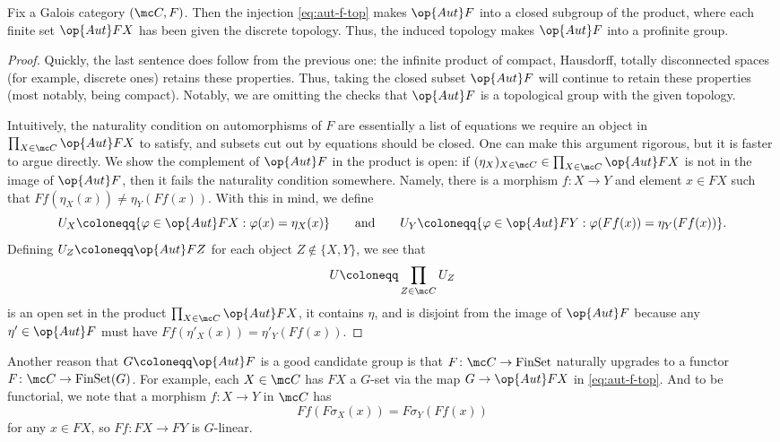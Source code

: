 \documentclass{amsart}
\begin{document}
\begin{lemma}
    Fix a Galois category $(\mc C,F)$. Then the injection \eqref{eq:aut-f-top} makes $\op{Aut}F$ into a closed subgroup of the product, where each finite set $\op{Aut}FX$ has been given the discrete topology. Thus, the induced topology makes $\op{Aut}F$ into a profinite group.
\end{lemma}
\begin{proof}
    Quickly, the last sentence does follow from the previous one: the infinite product of compact, Hausdorff, totally disconnected spaces (for example, discrete ones) retains these properties. Thus, taking the closed subset $\op{Aut}F$ will continue to retain these properties (most notably, being compact). Notably, we are omitting the checks that $\op{Aut}F$ is a topological group with the given topology.

    Intuitively, the naturality condition on automorphisms of $F$ are essentially a list of equations we require an object in $\prod_{X\in\mc C}\op{Aut}FX$ to satisfy, and subsets cut out by equations should be closed. One can make this argument rigorous, but it is faster to argue directly. We show the complement of $\op{Aut}F$ in the product is open: if $(\eta_X)_{X\in\mc C}\in\prod_{X\in\mc C}\op{Aut}FX$ is not in the image of $\op{Aut}F$, then it fails the naturality condition somewhere. Namely, there is a morphism $f\colon X\to Y$ and element $x\in FX$ such that $Ff(\eta_X(x))\ne\eta_Y(Ff(x))$. With this in mind, we define
    \[U_X\coloneqq\{\varphi\in\op{Aut}FX:\varphi(x)=\eta_X(x)\}\qquad\text{and}\qquad U_Y\coloneqq\{\varphi\in\op{Aut}FY:\varphi(Ff(x))=\eta_Y(Ff(x))\}.\]
    Defining $U_Z\coloneqq\op{Aut}FZ$ for each object $Z\notin\{X,Y\}$, we see that
    \[U\coloneqq\prod_{Z\in\mc C}U_Z\]
    is an open set in the product $\prod_{X\in\mc C}\op{Aut}FX$, it contains $\eta$, and is disjoint from the image of $\op{Aut}F$ because any $\eta'\in\op{Aut}F$ must have $Ff(\eta'_X(x))=\eta'_Y(Ff(x))$.
\end{proof}
\begin{remark} \label{rem:f-maps-to-g-set}
    Another reason that $G\coloneqq\op{Aut}F$ is a good candidate group is that $F\colon\mc C\to\mathrm{FinSet}$ naturally upgrades to a functor $F\colon\mc C\to\mathrm{FinSet}(G)$. For example, each $X\in\mc C$ has $FX$ a $G$-set via the map $G\to\op{Aut}FX$ in \eqref{eq:aut-f-top}. And to be functorial, we note that a morphism $f\colon X\to Y$ in $\mc C$ has
    \[Ff(F\sigma_X(x))=F\sigma_Y(Ff(x))\]
    for any $x\in FX$, so $Ff\colon FX\to FY$ is $G$-linear.
\end{remark}
\end{document}
